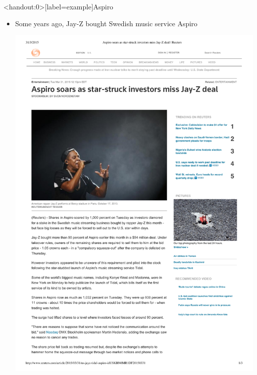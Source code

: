 \documentclass[english,10pt
,aspectratio=169
]{beamer}
\begin{document}
\begin{frame}<handout:0>[label=example]{Aspiro}
	\begin{itemize}
		\item Some years ago, Jay-Z bought Swedish music service Aspiro   
		\pause
		\begin{center}
			\includegraphics[width=.25\paperwidth]{pics/jayz}
		\end{center}
	\end{itemize}
\end{frame}
\end{document}
